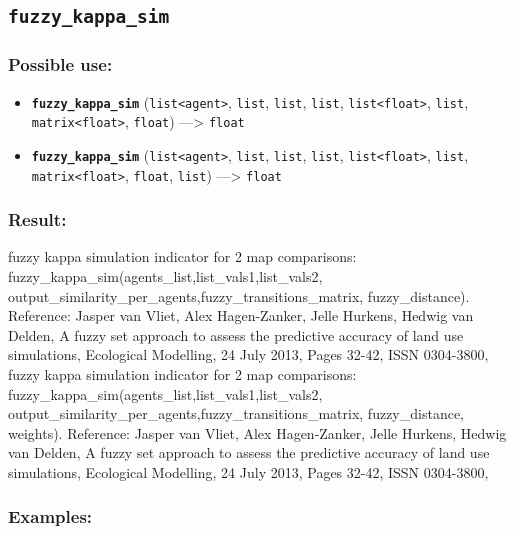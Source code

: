 \documentclass[]{book}
\providecommand{\tightlist}{%
  \setlength{\itemsep}{0pt}\setlength{\parskip}{0pt}}
\theoremstyle{definition}
\theoremstyle{definition}
\theoremstyle{definition}
\theoremstyle{remark}
\begin{document}
\subsection{\texorpdfstring{\texttt{fuzzy\_kappa\_sim}}{fuzzy\_kappa\_sim}}\label{fuzzy_kappa_sim}

\subsubsection{Possible use:}\label{possible-use-177}

\begin{itemize}
\tightlist
\item
  \textbf{\texttt{fuzzy\_kappa\_sim}}
  (\texttt{list\textless{}agent\textgreater{}}, \texttt{list},
  \texttt{list}, \texttt{list},
  \texttt{list\textless{}float\textgreater{}}, \texttt{list},
  \texttt{matrix\textless{}float\textgreater{}}, \texttt{float})
  ---\textgreater{} \texttt{float}
\item
  \textbf{\texttt{fuzzy\_kappa\_sim}}
  (\texttt{list\textless{}agent\textgreater{}}, \texttt{list},
  \texttt{list}, \texttt{list},
  \texttt{list\textless{}float\textgreater{}}, \texttt{list},
  \texttt{matrix\textless{}float\textgreater{}}, \texttt{float},
  \texttt{list}) ---\textgreater{} \texttt{float}
\end{itemize}

\subsubsection{Result:}\label{result-171}

fuzzy kappa simulation indicator for 2 map comparisons:
fuzzy\_kappa\_sim(agents\_list,list\_vals1,list\_vals2,
output\_similarity\_per\_agents,fuzzy\_transitions\_matrix,
fuzzy\_distance). Reference: Jasper van Vliet, Alex Hagen-Zanker, Jelle
Hurkens, Hedwig van Delden, A fuzzy set approach to assess the
predictive accuracy of land use simulations, Ecological Modelling, 24
July 2013, Pages 32-42, ISSN 0304-3800, fuzzy kappa simulation indicator
for 2 map comparisons:
fuzzy\_kappa\_sim(agents\_list,list\_vals1,list\_vals2,
output\_similarity\_per\_agents,fuzzy\_transitions\_matrix,
fuzzy\_distance, weights). Reference: Jasper van Vliet, Alex
Hagen-Zanker, Jelle Hurkens, Hedwig van Delden, A fuzzy set approach to
assess the predictive accuracy of land use simulations, Ecological
Modelling, 24 July 2013, Pages 32-42, ISSN 0304-3800,

\subsubsection{Examples:}\label{examples-132}
\end{document}
